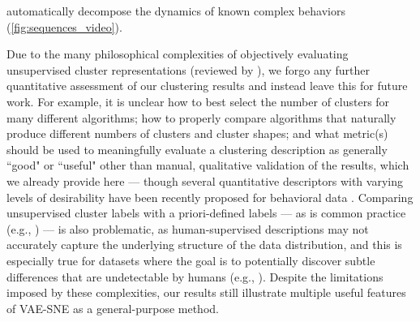 \documentclass[11pt,a4paper,oneside]{book}
\begin{document}
automatically decompose the dynamics of known complex behaviors (\ref{fig:sequences_video}).  

Due to the many philosophical complexities of objectively evaluating unsupervised cluster representations (reviewed by \citealt{jain1999data, kleinberg2003impossibility, todd2017systematic}), we forgo any further quantitative assessment of our clustering results and instead leave this for future work. For example, it is unclear how to best select the number of clusters for many different algorithms; how to properly compare algorithms that naturally produce different numbers of clusters and cluster shapes; and what metric(s) should be used to meaningfully evaluate a clustering description as generally ``good" or ``useful" other than manual, qualitative validation of the results, which we already provide here --- though several quantitative descriptors with varying levels of desirability have been recently proposed for behavioral data \citep{todd2017systematic}. Comparing unsupervised cluster labels with a priori-defined labels --- as is common practice (e.g., \citealt{jiang2016variational, xie2016unsupervised, guo2017improved, yang2019deep, luxem2020identifying}) --- is also problematic, as human-supervised descriptions may not accurately capture the underlying structure of the data distribution, and this is especially true for datasets where the goal is to potentially discover subtle differences that are undetectable by humans (e.g., \citealt{wiltschko2015mapping}). Despite the limitations imposed by these complexities, our results still illustrate multiple useful features of VAE-SNE as a general-purpose method.
\end{document}
